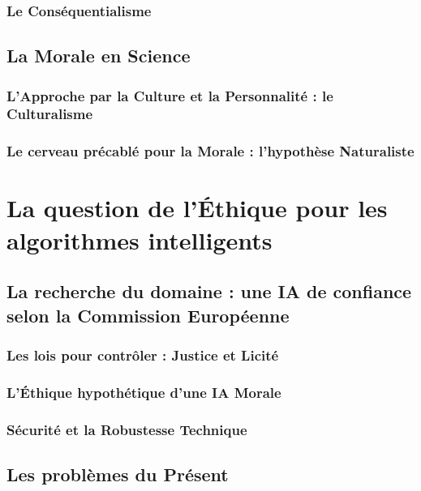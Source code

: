 \documentclass[10pt, french, a4paper]{report}
\begin{document}
\subsubsection{Le Conséquentialisme}

\subsection{La Morale en Science}

\subsubsection{L'Approche par la Culture et la Personnalité : le Culturalisme}

\subsubsection{Le cerveau précablé pour la Morale : l'hypothèse Naturaliste}



\section{La question de l'\uppercase{é}thique pour les algorithmes intelligents}

\subsection{La recherche du domaine : une IA de confiance selon la Commission Européenne}

\subsubsection{Les lois pour contrôler : Justice et Licité}

\subsubsection{L'\uppercase{é}thique hypothétique d'une IA Morale}

\subsubsection{Sécurité et la Robustesse Technique}

\subsection{Les problèmes du Présent}
\end{document}
